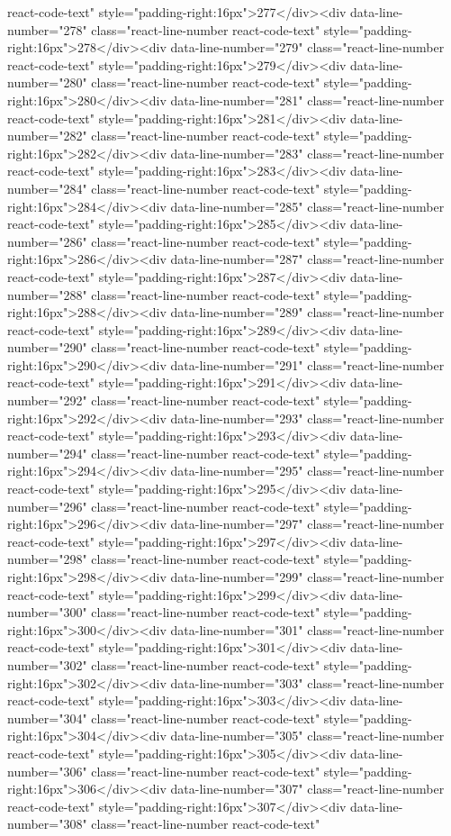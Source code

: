 react-code-text" style="padding-right:16px">277</div><div data-line-number="278" class="react-line-number react-code-text" style="padding-right:16px">278</div><div data-line-number="279" class="react-line-number react-code-text" style="padding-right:16px">279</div><div data-line-number="280" class="react-line-number react-code-text" style="padding-right:16px">280</div><div data-line-number="281" class="react-line-number react-code-text" style="padding-right:16px">281</div><div data-line-number="282" class="react-line-number react-code-text" style="padding-right:16px">282</div><div data-line-number="283" class="react-line-number react-code-text" style="padding-right:16px">283</div><div data-line-number="284" class="react-line-number react-code-text" style="padding-right:16px">284</div><div data-line-number="285" class="react-line-number react-code-text" style="padding-right:16px">285</div><div data-line-number="286" class="react-line-number react-code-text" style="padding-right:16px">286</div><div data-line-number="287" class="react-line-number react-code-text" style="padding-right:16px">287</div><div data-line-number="288" class="react-line-number react-code-text" style="padding-right:16px">288</div><div data-line-number="289" class="react-line-number react-code-text" style="padding-right:16px">289</div><div data-line-number="290" class="react-line-number react-code-text" style="padding-right:16px">290</div><div data-line-number="291" class="react-line-number react-code-text" style="padding-right:16px">291</div><div data-line-number="292" class="react-line-number react-code-text" style="padding-right:16px">292</div><div data-line-number="293" class="react-line-number react-code-text" style="padding-right:16px">293</div><div data-line-number="294" class="react-line-number react-code-text" style="padding-right:16px">294</div><div data-line-number="295" class="react-line-number react-code-text" style="padding-right:16px">295</div><div data-line-number="296" class="react-line-number react-code-text" style="padding-right:16px">296</div><div data-line-number="297" class="react-line-number react-code-text" style="padding-right:16px">297</div><div data-line-number="298" class="react-line-number react-code-text" style="padding-right:16px">298</div><div data-line-number="299" class="react-line-number react-code-text" style="padding-right:16px">299</div><div data-line-number="300" class="react-line-number react-code-text" style="padding-right:16px">300</div><div data-line-number="301" class="react-line-number react-code-text" style="padding-right:16px">301</div><div data-line-number="302" class="react-line-number react-code-text" style="padding-right:16px">302</div><div data-line-number="303" class="react-line-number react-code-text" style="padding-right:16px">303</div><div data-line-number="304" class="react-line-number react-code-text" style="padding-right:16px">304</div><div data-line-number="305" class="react-line-number react-code-text" style="padding-right:16px">305</div><div data-line-number="306" class="react-line-number react-code-text" style="padding-right:16px">306</div><div data-line-number="307" class="react-line-number react-code-text" style="padding-right:16px">307</div><div data-line-number="308" class="react-line-number react-code-text" 